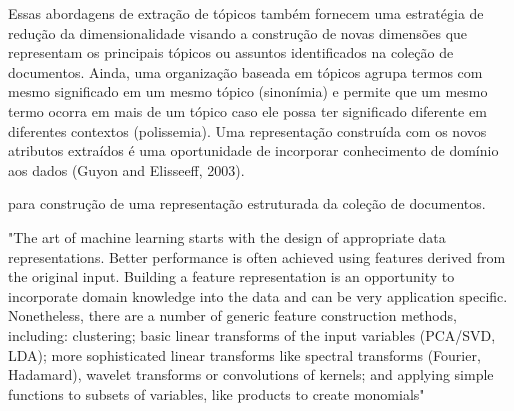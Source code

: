 










Essas abordagens de extração de tópicos também fornecem uma estratégia de redução da dimensionalidade visando a construção de novas dimensões que representam os principais tópicos ou assuntos identificados na coleção de documentos. Ainda, uma organização baseada em tópicos agrupa termos com mesmo significado em um mesmo tópico (sinonímia) e permite que um mesmo termo ocorra em mais de um tópico caso ele possa ter significado diferente em diferentes contextos (polissemia). Uma representação construída com os novos atributos extraídos é uma oportunidade de incorporar conhecimento de domínio aos dados (Guyon and Elisseeff, 2003).


para construção de uma representação estruturada da coleção de documentos.





"The art of machine learning starts with the design of appropriate data representations.  Better performance is often achieved using features derived from the original input. Building a feature representation is an opportunity to incorporate domain knowledge into the data and can be very application specific. Nonetheless, there are a number of generic feature construction methods, including: clustering; basic linear transforms of the input variables (PCA/SVD, LDA); more sophisticated linear transforms like spectral transforms (Fourier, Hadamard), wavelet transforms or convolutions of kernels; and applying simple functions to subsets of variables, like products to create monomials"







